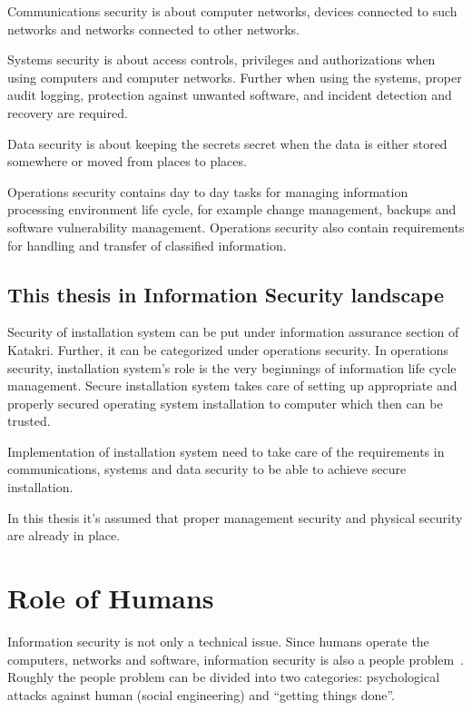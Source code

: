 Communications security is about computer networks, devices connected
to such networks and networks connected to other networks.

Systems security is about access controls, privileges and
authorizations when using computers and computer networks. Further
when using the systems, proper audit logging, protection against
unwanted software, and incident detection and recovery are required.

Data security is about keeping the secrets secret when the data is
either stored somewhere or moved from places to places.

Operations security contains day to day tasks for managing information
processing environment life cycle, for example change management,
backups and software vulnerability management. Operations security
also contain requirements for handling and transfer of classified
information.


\subsection{This thesis in Information Security landscape}

Security of installation system can be put under information assurance
section of Katakri. Further, it can be categorized under operations
security. In operations security, installation system's role is the
very beginnings of information life cycle management. Secure
installation system takes care of setting up appropriate and properly
secured operating system installation to computer which then can be
trusted.

Implementation of installation system need to take care of the
requirements in communications, systems and data security to be able
to achieve secure installation.

In this thesis it's assumed that proper management security and
physical security are already in place.


\section{Role of Humans}

Information security is not only a technical issue. Since humans
operate the computers, networks and software, information security is
also a people problem~\cite{parsons2010human}\cite{anderson}. Roughly
the people problem can be divided into two categories: psychological
attacks against human (social engineering) and ``getting things
done''.

